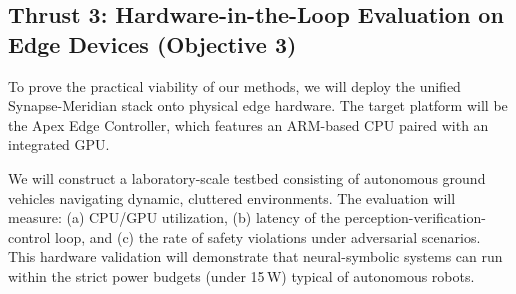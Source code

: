 \subsection{Thrust 3: Hardware-in-the-Loop Evaluation on Edge Devices (Objective 3)}
To prove the practical viability of our methods, we will deploy the unified Synapse-Meridian stack onto physical edge hardware. The target platform will be the Apex Edge Controller, which features an ARM-based CPU paired with an integrated GPU. 

We will construct a laboratory-scale testbed consisting of autonomous ground vehicles navigating dynamic, cluttered environments. The evaluation will measure: (a) CPU/GPU utilization, (b) latency of the perception-verification-control loop, and (c) the rate of safety violations under adversarial scenarios. This hardware validation will demonstrate that neural-symbolic systems can run within the strict power budgets (under 15\,W) typical of autonomous robots.
